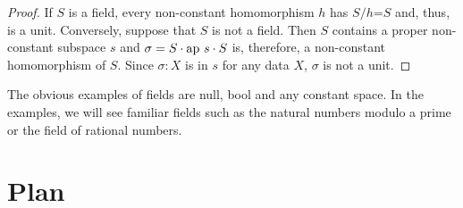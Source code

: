 \documentclass[11pt]{article}
\begin{document}
\begin{proof} If $S$ is a field, every non-constant homomorphism $h$ has $S/h$=$S$ and, thus, is a unit.  Conversely, 
suppose that $S$ is not a field.  Then $S$ contains a proper non-constant subspace $s$ and $\sigma = S\cdot {\rm ap}\ s\cdot S$ is,
therefore, a non-constant homomorphism of $S$.  Since $\sigma:X$ is in $s$ for any data $X$, $\sigma$ is not a unit. 
\end{proof}
\noindent 
The obvious examples of fields are null, bool and any constant space.  In the examples, we will see familiar fields such 
as the natural numbers modulo a prime or the field of rational numbers.   

\section{Plan}
\end{document}
